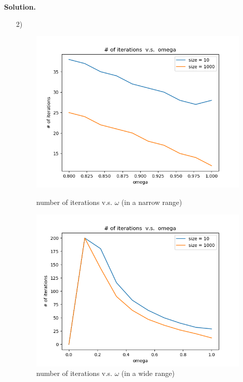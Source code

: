 \documentclass[english,onecolumn]{IEEEtran}
\begin{document}
\noindent
\textbf{Solution.}
\newpage
\begin{enumerate}
    \item[2)]
    \begin{figure}[htbp]
        \begin{minipage}[t]{0.5\linewidth} 
            \centering
            \includegraphics[width=1\textwidth]{p3_2.png}
            \caption{number of iterations v.s. $\omega$ (in a narrow range)}
            \label{fig.p3_2}
        \end{minipage}
        \begin{minipage}[t]{0.5\linewidth}
            \centering
            \includegraphics[width=1\textwidth]{p3_2_general.png}
            \caption{number of iterations v.s. $\omega$ (in a wide range)}

\end{minipage}
\end{figure}
\end{enumerate}
\end{document}
